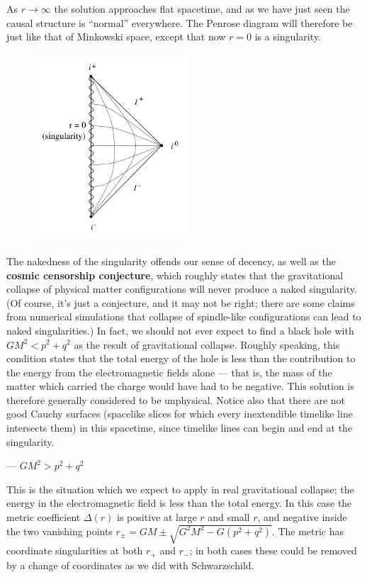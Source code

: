 \documentclass[12pt]{article}
\begin{document}
As $r\rightarrow\infty$ the solution approaches flat spacetime,
and as we have just seen the causal structure is ``normal'' everywhere.
The Penrose diagram will therefore be just like that of Minkowski
space, except that now $r=0$ is a singularity.

\begin{figure}[h]
  \centerline{
  \includegraphics[height=7cm]{pdf/seven29}}
\end{figure}

\noindent  The nakedness of the singularity offends our sense of
decency, as well as the {\bf cosmic censorship conjecture}, which
roughly states that the gravitational collapse of physical
matter configurations will never produce a naked singularity.
(Of course, it's just a conjecture, and it may not be right; there
are some claims from numerical simulations that collapse of
spindle-like configurations can lead to naked singularities.)
In fact, we should not ever expect to find a black hole with
$GM^2<p^2+q^2$ as the result of gravitational collapse.  Roughly
speaking, this condition states that the total energy of the hole
is less than the contribution to the energy from the electromagnetic
fields alone --- that is, the mass of the matter which carried the
charge would have had to be negative.  This solution is therefore
generally considered to be unphysical.  Notice also that there
are not good Cauchy surfaces (spacelike slices for which every
inextendible timelike line intersects them) in this spacetime, since
timelike lines can begin and end at the singularity.

 --- $GM^2>p^2+q^2$

This is the situation which we expect to apply in real gravitational
collapse; the energy in the electromagnetic field is less than the
total energy.  In this case the metric coefficient $\Delta(r)$ is
positive at large $r$ and small $r$, and negative inside the two
vanishing points $r_\pm = GM\pm \sqrt{G^2M^2 - G(p^2+q^2)}$.  The 
metric has coordinate singularities at both $r_+$ and $r_-$; in
both cases these could be removed by a change of coordinates as we
did with Schwarzschild.
\end{document}
